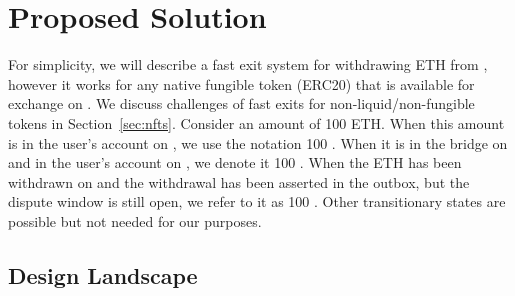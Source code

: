 
\section{Proposed Solution} 

For simplicity, we will describe a fast exit system for withdrawing ETH from \layertwo, however it works for any \layerone native fungible token (\eg ERC20) that is available for exchange on \layerone. We discuss challenges of fast exits for non-liquid/non-fungible tokens in Section~\ref{sec:nfts}. Consider an amount of 100 ETH. When this amount is in the user's account on \layerone, we use the notation 100 \ethone. When it is in the bridge on \layerone and in the user's account on \layertwo, we denote it 100 \ethtwo. When the ETH has been withdrawn on \layertwo and the withdrawal has been asserted in the \layerone outbox, but the dispute window is still open, we refer to it as 100 \ethxx. Other transitionary states are possible but not needed for our purposes.

\subsection{Design Landscape}

